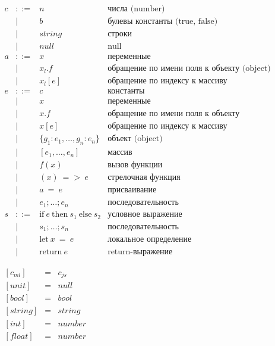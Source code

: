 \documentclass[12pt]{matmex-diploma}
\newcommand \bnfdef  {\mathrel{::=}}
\newcommand \bnfalt  {\mathrel{{|}}}
\newcommand \lpar  {\mathrel{{[}}}
\newcommand \rpar  {\mathrel{{]}}}
\begin{document}
\begin{center}
$
\begin{array}{llll}
c & \bnfdef & n & \mbox{числа (number)} \\
  & \bnfalt & b & \mbox{булевы константы (true, false)} \\
  & \bnfalt & string & \mbox{строки} \\
  & \bnfalt & null & \mbox{null}\\[1ex]

a & \bnfdef & x & \mbox{переменные} \\
  & \bnfalt & x_l.f & \mbox{обращение по имени поля к объекту (object)} \\
  & \bnfalt & x_l[e] & \mbox{обращение по индексу к массиву} \\[1ex]
  
e & \bnfdef & c & \mbox{константы} \\
  & \bnfalt & x & \mbox{переменные} \\
  & \bnfalt & x.f & \mbox{обращение по имени поля к объекту} \\
  & \bnfalt & x[e] & \mbox{обращение по индексу к массиву} \\
  & \bnfalt & \{ g_1:e_1, \ldots, g_n:e_n \} & \mbox{объект (object)} \\
  & \bnfalt & [e_1, \ldots, e_n] & \mbox{массив} \\
  & \bnfalt & f(x) & \mbox{вызов функции} \\
  & \bnfalt & (x) ~=>~ e & \mbox{стрелочная функция} \\
  & \bnfalt & a ~=~ e & \mbox{присваивание} \\
  & \bnfalt & e_1; \ldots; e_n & \mbox{последовательность} \\[1ex]
  
s & \bnfdef & \mbox{if}~ e ~\mbox{then}~ s_1 ~\mbox{else}~ s_2 & \mbox{условное выражение} \\
  & \bnfalt & s_1; \ldots; s_n & \mbox{последовательность} \\
  & \bnfalt & \mbox{let}~ x ~=~ e & \mbox{локальное определение} \\
  & \bnfalt & \mbox{return}~e & \mbox{return-выражение}
\end{array}
$
\captionsetup{type=lstlisting}
\label{tbl:syntaxjs}
\end{center}

\clearpage

\begin{center}
$
\begin{array}{lll}
\lpar c_{ml} \rpar &=& c_{js} \\
\lpar unit \rpar &=& null \\
\lpar bool \rpar &=& bool \\
\lpar string \rpar &=& string \\ 
\lpar int \rpar &=& number \\
\lpar float \rpar &=& number
\end{array}
$
\captionsetup{type=lstlisting}
\label{tbl:tr_const}
\end{center}
\end{document}
